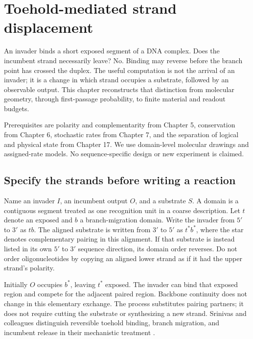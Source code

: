 \chapter{Toehold-mediated strand displacement}
An invader binds a short exposed segment of a DNA complex. Does the incumbent
strand necessarily leave? No. Binding may reverse before the branch point has
crossed the duplex. The useful computation is not the arrival of an invader;
it is a change in which strand occupies a substrate, followed by an observable
output. This chapter reconstructs that distinction from molecular geometry,
through first-passage probability, to finite material and readout budgets.

Prerequisites are polarity and complementarity from Chapter 5, conservation
from Chapter 6, stochastic rates from Chapter 7, and the separation of logical
and physical state from Chapter 17. We use domain-level molecular drawings and
assigned-rate models. No sequence-specific design or new experiment is claimed.

\section{Specify the strands before writing a reaction}
Name an invader $I$, an incumbent output $O$, and a substrate $S$. A domain is
a contiguous segment treated as one recognition unit in a coarse description.
Let $t$ denote an exposed  and $b$ a branch-migration domain.
Write the invader from $5'$ to $3'$ as $tb$. The aligned substrate is written
from $3'$ to $5'$ as $t^*b^*$, where the star denotes complementary pairing
in this alignment. If that substrate is instead listed in its own $5'$ to
$3'$ sequence direction, its domain order reverses. Do not order oligonucleotides
by copying an aligned lower strand as if it had the upper strand's polarity.

Initially $O$ occupies $b^*$, leaving $t^*$ exposed. The invader can bind that
exposed region and compete for the adjacent paired region. Backbone continuity
does not change in this elementary exchange. The process substitutes pairing
partners; it does not require cutting the substrate or synthesizing a new strand.
Srinivas and colleagues distinguish reversible toehold binding, branch migration,
and incumbent release in their mechanistic treatment \cite{srinivas}.


